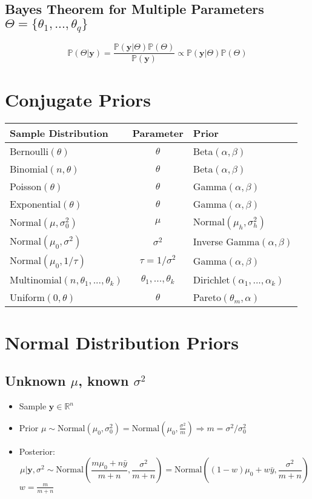 \documentclass[12pt]{article}
\theoremstyle{definition}
\newcommand{\Prob}[1]{\mathbb{P}(#1)}
\begin{document}
\subsection*{Bayes Theorem for Multiple Parameters $\Theta = \{\theta_1,...,\theta_q\}$}
$$\Prob{\Theta|\bm{y}} = \frac{\Prob{\bm{y}|\Theta}\Prob{\Theta}}{\Prob{\bm{y}}} \propto \Prob{\bm{y}|\Theta}\Prob{\Theta}$$

\newpage
\section{Conjugate Priors}
\begin{center}
    \begin{tabular}{|l|c|l|}
        \hline
        Sample Distribution & Parameter & Prior\\
        \hline\hline
        Bernoulli$(\theta)$ & $\theta$ & Beta$(\alpha,\beta)$\\
        \hline
        Binomial$(n,\theta)$ & $\theta$ & Beta$(\alpha,\beta)$\\
        \hline
        Poisson$(\theta)$ & $\theta$ & Gamma$(\alpha,\beta)$\\
        \hline
        Exponential$(\theta)$ & $\theta$ & Gamma$(\alpha,\beta)$\\
        \hline
        Normal$(\mu,\sigma_0^2)$ & $\mu$ & Normal$(\mu_h,\sigma_h^2)$\\
        \hline
        Normal$(\mu_0,\sigma^2)$ & $\sigma^2$ & Inverse Gamma$(\alpha,\beta)$\\
        \hline
        Normal$(\mu_0,1/\tau)$ & $\tau = 1/\sigma^2$ & Gamma$(\alpha,\beta)$\\
        \hline
        Multinomial$(n,\theta_1,...,\theta_k)$ & $\theta_1,...,\theta_k$ &  Dirichlet$(\alpha_1,...,\alpha_k)$\\
        \hline
        Uniform$(0,\theta)$ & $\theta$ & Pareto$(\theta_m,\alpha)$\\
        \hline
    \end{tabular}
\end{center}
\section{Normal Distribution Priors}
    \subsection*{Unknown $\mu$, known $\sigma^2$}
    \begin{itemize}
        \item Sample $\bm{y} \in \mathbb{R}^n$
        \item Prior $\mu \sim \text{Normal}(\mu_0,\sigma_0^2) = \text{Normal}\left(\mu_0,\frac{\sigma^2}{m}\right) \Rightarrow m = \sigma^2/\sigma_0^2$
        \item Posterior: $$\mu|\bm{y},\sigma^2 \sim \text{Normal}\left( \frac{m\mu_0 + n\bar{y}}{m+n} , \frac{\sigma^2}{m+n} \right) = \text{Normal}\left( (1-w)\mu_0 + w\bar{y} , \frac{\sigma^2}{m+n} \right)$$
            $w = \frac{m}{m+n}$
    \end{itemize}
\end{document}
